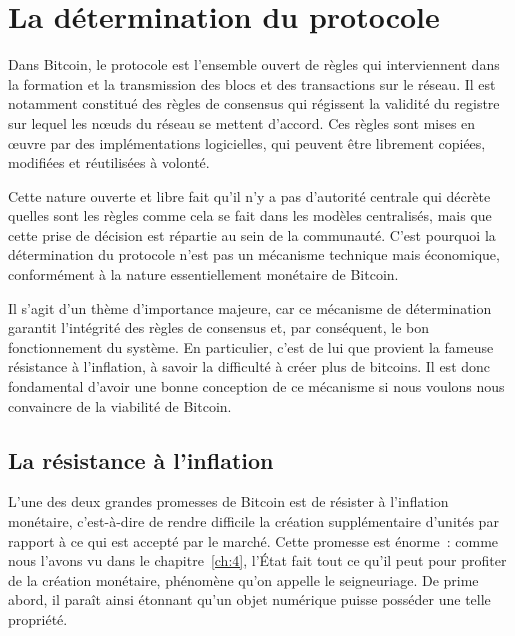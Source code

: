 
\chapter{La détermination du protocole}
\label{ch:11}

Dans Bitcoin, le protocole est l'ensemble ouvert de règles qui interviennent dans la formation et la transmission des blocs et des transactions sur le réseau. Il est notamment constitué des règles de consensus qui régissent la validité du registre sur lequel les nœuds du réseau se mettent d'accord. Ces règles sont mises en œuvre par des implémentations logicielles, qui peuvent être librement copiées, modifiées et réutilisées à volonté.

Cette nature ouverte et libre fait qu'il n'y a pas d'autorité centrale qui décrète quelles sont les règles comme cela se fait dans les modèles centralisés, mais que cette prise de décision est répartie au sein de la communauté. C'est pourquoi la détermination du protocole n'est pas un mécanisme technique mais économique, conformément à la nature essentiellement monétaire de Bitcoin.

Il s'agit d'un thème d'importance majeure, car ce mécanisme de détermination garantit l'intégrité des règles de consensus et, par conséquent, le bon fonctionnement du système. En particulier, c'est de lui que provient la fameuse résistance à l'inflation, à savoir la difficulté à créer plus de bitcoins. Il est donc fondamental d'avoir une bonne conception de ce mécanisme si nous voulons nous convaincre de la viabilité de Bitcoin.

%

\section*{La résistance à l'inflation}

L'une des deux grandes promesses de Bitcoin est de résister à l'inflation monétaire, c'est-à-dire de rendre difficile la création supplémentaire d'unités par rapport à ce qui est accepté par le marché. Cette promesse est énorme~: comme nous l'avons vu dans le chapitre~\ref{ch:4}, l'État fait tout ce qu'il peut pour profiter de la création monétaire, phénomène qu'on appelle le seigneuriage. De prime abord, il paraît ainsi étonnant qu'un objet numérique puisse posséder une telle propriété.

